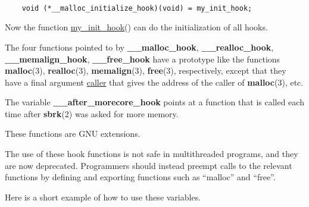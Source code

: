 \documentclass[]{article}
\let\realtextbf=\textbf
\renewcommand{\textbf}[1]{\textcolor{boldcolor}{\realtextbf{#1}}}
\renewcommand{\emph}[1]{\underline{#1}}
\begin{document}
\begin{verbatim}

    void (*__malloc_initialize_hook)(void) = my_init_hook;
\end{verbatim}

Now the function \emph{my\_init\_hook}() can do the initialization of
all hooks.

The four functions pointed to by \textbf{\_\_malloc\_hook},
\textbf{\_\_realloc\_hook}, \textbf{\_\_memalign\_hook},
\textbf{\_\_free\_hook} have a prototype like the functions
\textbf{malloc}(3), \textbf{realloc}(3), \textbf{memalign}(3),
\textbf{free}(3), respectively, except that they have a final argument
\emph{caller} that gives the address of the caller of
\textbf{malloc}(3), etc.

The variable \textbf{\_\_after\_morecore\_hook} points at a function
that is called each time after \textbf{sbrk}(2) was asked for more
memory.


These functions are GNU extensions.


The use of these hook functions is not safe in multithreaded programs,
and they are now deprecated. Programmers should instead preempt calls to
the relevant functions by defining and exporting functions such as
``malloc'' and ``free''.


Here is a short example of how to use these variables.

~
\end{document}
